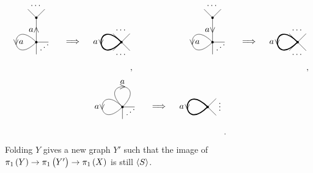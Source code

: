 $$
\begin{tikzpicture}
\fill (0, 0) circle (0.05);
\fill (0, 1) circle (0.05);
\draw (0, 0) to (0.5, 0);
\draw (0, -0.5) node[above right]{$ \iddots $};
\draw (0, 0) to (0, -0.5);
\draw (0, 1) to (-0.35, 1.35);
\draw (0, 1.5) node{$ \dots $};
\draw (0, 1) to (0.35, 1.35);
\draw (0, 0) to node{$ \wedge $} node[left]{$ a $} (0, 1);
\draw (0, 0) to [in=-135, out=135, distance=45] node{$ \vee $} node[right]{$ a $} (0, 0);
\draw (1.5, 0) node{$ \implies $};
\fill (3.5, 0) circle (0.05);
\draw (3.5, 0) to (3.85, -0.35);
\draw (3.5, -0.5) node{$ \dots $};
\draw (3.5, 0) to (3.15, -0.35);
\draw (3.5, 0) to (3.15, 0.35);
\draw (3.5, 0.5) node{$ \dots $};
\draw (3.5, 0) to (3.85, 0.35);
\draw [very thick] (3.5, 0) to [in=-135, out=135, distance=45] node{$ \vee $} node[left]{$ a $} (3.5, 0);
\end{tikzpicture},
\qquad \qquad \qquad
\begin{tikzpicture}
\fill (0, 0) circle (0.05);
\fill (0, 1) circle (0.05);
\draw (0, 0) to (0.5, 0);
\draw (0, -0.5) node[above right]{$ \iddots $};
\draw (0, 0) to (0, -0.5);
\draw (0, 1) to (-0.35, 1.35);
\draw (0, 1.5) node{$ \dots $};
\draw (0, 1) to (0.35, 1.35);
\draw (0, 1) to node{$ \vee $} node[left]{$ a $} (0, 0);
\draw (0, 0) to [in=-135, out=135, distance=45] node{$ \vee $} node[right]{$ a $} (0, 0);
\draw (1.5, 0) node{$ \implies $};
\fill (3.5, 0) circle (0.05);
\draw (3.5, 0) to (3.85, -0.35);
\draw (3.5, -0.5) node{$ \dots $};
\draw (3.5, 0) to (3.15, -0.35);
\draw (3.5, 0) to (3.15, 0.35);
\draw (3.5, 0.5) node{$ \dots $};
\draw (3.5, 0) to (3.85, 0.35);
\draw [very thick] (3.5, 0) to [in=-135, out=135, distance=45] node{$ \vee $} node[left]{$ a $} (3.5, 0);
\end{tikzpicture},
$$
$$
\begin{tikzpicture}
\fill (0, 0) circle (0.05);
\draw (0, 0) to (0.5, 0);
\draw (0, -0.5) node[above right]{$ \iddots $};
\draw (0, 0) to (0, -0.5);
\draw (0, 0) to [in=-135, out=135, distance=45] node{$ \vee $} node[left]{$ a $} (0, 0);
\draw (0, 0) to [in=45, out=135, distance=45] node{$ > $} node[above]{$ a $} (0, 0);
\draw (1.5, 0) node{$ \implies $};
\fill (3.5, 0) circle (0.05);
\draw (3.5, 0) to (3.85, -0.35);
\draw (4, 0.5) node[below]{$ \vdots $};
\draw (3.5, 0) to (3.85, 0.35);
\draw [very thick] (3.5, 0) to [in=-135, out=135, distance=45] node{$ \vee $} node[left]{$ a $} (3.5, 0);
\end{tikzpicture}.
$$

\begin{fact}
Folding $ Y $ gives a new graph $ Y' $ such that the image of $ \pi_1\br{Y} \to \pi_1\br{Y'} \to \pi_1\br{X} $ is still $ \left\langle S \right\rangle $.
\end{fact}

